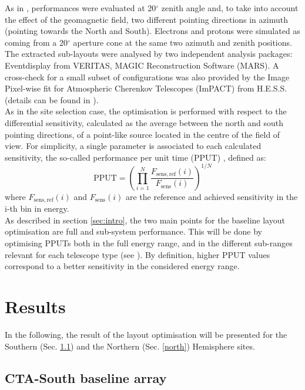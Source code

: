 \documentclass{PoS}
\begin{document}
As in \cite{APP_CTA_MC, Hassan2017Apj}, performances were evaluated at 20$^\circ$ zenith angle and, to take into account the effect of the geomagnetic field, two different pointing directions in azimuth (pointing towards the North and South). Electrons and protons were simulated as coming from a 20$^\circ$ aperture cone at the same two azimuth and zenith positions. The extracted sub-layouts were analysed by two independent analysis packages: Eventdisplay from VERITAS, MAGIC Reconstruction Software (MARS). A cross-check for a small subset of configurations was also provided by the Image Pixel-wise fit for Atmospheric Cherenkov Telescopes (ImPACT) from H.E.S.S. (details can be found in \cite{APP_CTA_MC, evnDisplay, MARS, impact}).\\
As in the site selection case, the optimisation is performed with respect to the differential sensitivity, calculated as the average between the north and south pointing directions, of a point-like source located in the centre of the field of view. For simplicity, a single parameter is associated to each calculated sensitivity, the so-called performance per unit time (PPUT) \cite{Hassan2017Apj}, defined as: 
\begin{equation}
\mathrm{PPUT} =  \left( \prod_{i=1}^{N} \frac{F_\mathrm{sens,ref}(i)}{F_\mathrm{sens}(i)} \right)^{1/N}
\end{equation}
where $F_\mathrm{sens,ref}(i)$ and $F_\mathrm{sens}(i)$ are the reference and achieved sensitivity in the i-th bin in energy.\\
As described in section \ref{sec:intro}, the two main points for the baseline layout optimisation are full and sub-system performance. This will be done by optimising PPUTs both in the full energy range, and in the different sub-ranges relevant for each telescope type (see \cite{APP_CTA_MC,Hassan-2015}). By definition, higher PPUT values correspond to a better sensitivity in the considered energy range.\\

\section{Results}

In the following, the result of the layout optimisation will be presented for the Southern (Sec. \ref{south}) and the Northern (Sec. \ref{north}) Hemisphere sites.

\subsection{CTA-South baseline array}\label{south}
\end{document}
